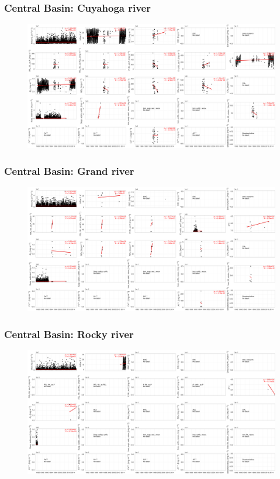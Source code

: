 \documentclass{beamer}
\begin{document}
\begin{frame}
\frametitle{Central Basin: Cuyahoga river}

\begin{figure}
\includegraphics[width=\textwidth]{rivers/Central basin/cuyahogariver.png}
\end{figure}

\end{frame}

\begin{frame}
\frametitle{Central Basin: Grand river}

\begin{figure}
\includegraphics[width=\textwidth]{rivers/Central basin/grandriver.png}
\end{figure}

\end{frame}

\begin{frame}
\frametitle{Central Basin: Rocky river}

\begin{figure}
\includegraphics[width=\textwidth]{rivers/Central basin/rockyriver.png}
\end{figure}

\end{frame}
\end{document}
